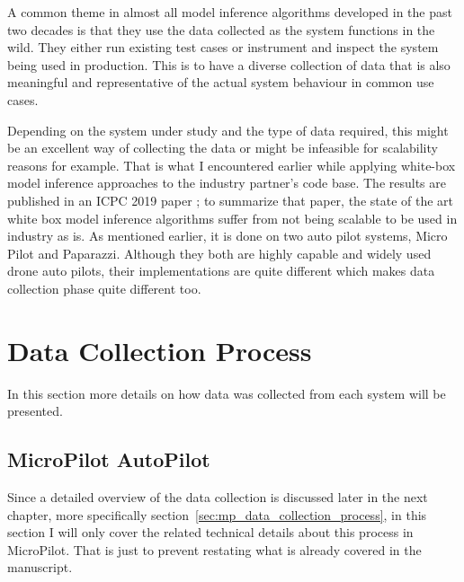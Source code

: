 A common theme in almost all model inference algorithms developed in the past two decades is that they use the data collected as the system functions in the wild. They either run existing test cases or instrument and inspect the system being used in production. 
This is to have a diverse collection of data that is also meaningful and representative of the actual system behaviour in common use cases.

Depending on the system under study and the type of data required, this might be an excellent way of collecting the data or might be infeasible for scalability reasons for example. That is what I encountered earlier while applying white-box model inference approaches to the industry partner's code base. The results are published in an ICPC 2019 paper \cite{mashhadi2019empirical}; to summarize that paper, the state of the art white box model inference algorithms suffer from not being scalable to be used in industry as is.
As mentioned earlier, it is done on two auto pilot systems, Micro Pilot and Paparazzi. \cite{hattenberger2014using}
Although they both are highly capable and widely used drone auto pilots, their implementations are quite different which makes data collection phase quite different too.

\section{Data Collection Process}
In this section more details on how data was collected from each system will be presented. 

\subsection{MicroPilot AutoPilot}

Since a detailed overview of the data collection is discussed later in the next chapter, more specifically section~\ref{sec:mp_data_collection_process}, in this section I will only cover the related technical details about this process in MicroPilot. That is just to prevent restating what is already covered in the manuscript.

